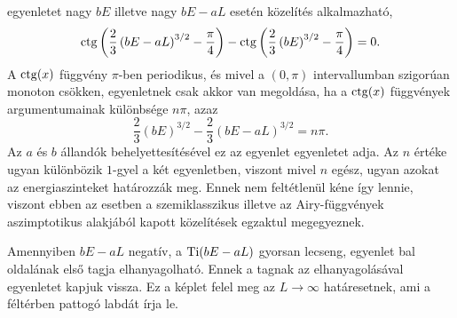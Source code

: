  egyenletet nagy $bE$ illetve nagy $bE-aL$ esetén  közelítés alkalmazható,
\begin{equation}
	\operatorname{ctg}\left(\frac{2}{3}\left(bE-aL\right)^{3/2}-\frac{\pi}{4}\right)-\operatorname{ctg}\left(\frac{2}{3}\left(bE\right)^{3/2}-\frac{\pi}{4}\right)=0.
	\label{quantumApprox:cot}
\end{equation}
A $\operatorname{ctg}(x)$ függvény $\pi$-ben periodikus, és mivel a $(0,\pi)$ intervallumban szigorúan monoton csökken,  egyenletnek csak akkor van megoldása, ha a $\operatorname{ctg}(x)$ függvények argumentumainak különbsége $n\pi$, azaz
\begin{equation}
	\frac{2}{3}\left(bE\right)^{3/2}-\frac{2}{3}\left(bE-aL\right)^{3/2}=n\pi.
\end{equation}
Az $a$ és $b$ állandók behelyettesítésével ez az egyenlet  egyenletet adja. Az $n$  értéke ugyan különbözik $1$-gyel a két egyenletben, viszont mivel $n$ egész, ugyan azokat az energiaszinteket határozzák meg. Ennek nem feltétlenül kéne így lennie, viszont ebben az esetben a szemiklasszikus illetve az Airy-függvények aszimptotikus alakjából kapott közelítések egzaktul megegyeznek.

Amennyiben $bE-aL$ negatív, a $\mathrm{Ti}(bE-aL)$ gyorsan lecseng,  egyenlet bal oldalának első tagja elhanyagolható. Ennek a tagnak az elhanyagolásával  egyenletet kapjuk vissza. Ez a képlet felel meg az $L\to\infty$ határesetnek, ami a féltérben pattogó labdát írja le.

